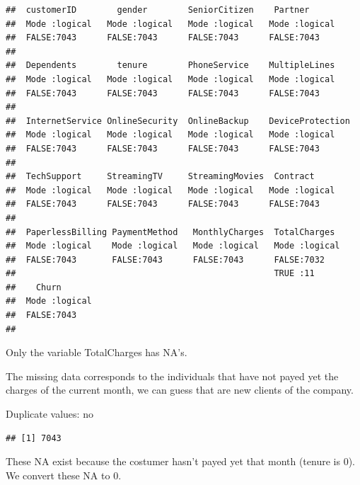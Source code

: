 \documentclass[
  twoside]{article}
\newenvironment{Shaded}{\begin{snugshade}}{\end{snugshade}}
\newcommand{\FunctionTok}[1]{\textcolor[rgb]{0.13,0.29,0.53}{\textbf{#1}}}
\newcommand{\NormalTok}[1]{#1}
\newcommand{\SpecialCharTok}[1]{\textcolor[rgb]{0.81,0.36,0.00}{\textbf{#1}}}
\begin{document}
\begin{verbatim}
##  customerID        gender        SeniorCitizen    Partner       
##  Mode :logical   Mode :logical   Mode :logical   Mode :logical  
##  FALSE:7043      FALSE:7043      FALSE:7043      FALSE:7043     
##                                                                 
##  Dependents        tenure        PhoneService    MultipleLines  
##  Mode :logical   Mode :logical   Mode :logical   Mode :logical  
##  FALSE:7043      FALSE:7043      FALSE:7043      FALSE:7043     
##                                                                 
##  InternetService OnlineSecurity  OnlineBackup    DeviceProtection
##  Mode :logical   Mode :logical   Mode :logical   Mode :logical   
##  FALSE:7043      FALSE:7043      FALSE:7043      FALSE:7043      
##                                                                  
##  TechSupport     StreamingTV     StreamingMovies  Contract      
##  Mode :logical   Mode :logical   Mode :logical   Mode :logical  
##  FALSE:7043      FALSE:7043      FALSE:7043      FALSE:7043     
##                                                                 
##  PaperlessBilling PaymentMethod   MonthlyCharges  TotalCharges   
##  Mode :logical    Mode :logical   Mode :logical   Mode :logical  
##  FALSE:7043       FALSE:7043      FALSE:7043      FALSE:7032     
##                                                   TRUE :11       
##    Churn        
##  Mode :logical  
##  FALSE:7043     
## 
\end{verbatim}

Only the variable TotalCharges has NA's.

The missing data corresponds to the individuals that have not payed yet
the charges of the current month, we can guess that are new clients of
the company.

Duplicate values: no

\begin{Shaded}
\end{Shaded}

\begin{verbatim}
## [1] 7043
\end{verbatim}

These NA exist because the costumer hasn't payed yet that month (tenure
is 0). We convert these NA to 0.
\end{document}
